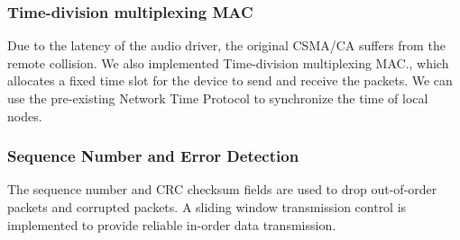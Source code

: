 \subsubsection{Time-division multiplexing MAC}
Due to the latency of the audio driver, the original CSMA/CA suffers from the remote collision. We also implemented Time-division multiplexing MAC., which allocates a fixed time slot for the device to send and receive the packets. We can use the pre-existing Network Time Protocol to synchronize the time of local nodes.

\subsubsection{Sequence Number and Error Detection}
The sequence number and CRC checksum fields are used to drop out-of-order packets and corrupted packets.
A sliding window transmission control is implemented to provide reliable in-order data transmission.

